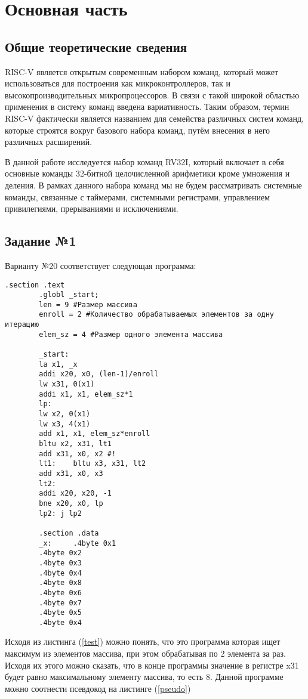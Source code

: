 \chapter{Основная часть}
\section{Общие теоретические сведения}

RISC-V является открытым современным набором команд, который может использоваться для
построения как микроконтроллеров, так и высокопроизводительных микропроцессоров.
В связи с такой широкой областью применения в систему команд введена вариативность.
Таким образом, термин RISC-V фактически является названием для семейства различных систем
команд, которые строятся вокруг базового набора команд, путём внесения в него различных расширений.


В данной работе исследуется набор команд RV32I, который включает в себя основные
команды 32-битной целочисленной арифметики кроме умножения и деления. В рамках
данного набора команд мы не будем рассматривать системные команды, связанные с
таймерами, системными регистрами, управлением привилегиями, прерываниями и исключениями.

\section{Задание №1}

Варианту №20 соответствует следующая программа:

\begin{lstlisting}[label=test,caption={Программа варианта №20}]
	  .section .text
		.globl _start;
		len = 9 #Размер массива
		enroll = 2 #Количество обрабатываемых элементов за одну итерацию
		elem_sz = 4 #Размер одного элемента массива
		
		_start:
		la x1, _x
		addi x20, x0, (len-1)/enroll
		lw x31, 0(x1)
		addi x1, x1, elem_sz*1
		lp:
		lw x2, 0(x1)
		lw x3, 4(x1)
		add x1, x1, elem_sz*enroll
		bltu x2, x31, lt1
		add x31, x0, x2 #!
		lt1:    bltu x3, x31, lt2
		add x31, x0, x3
		lt2:
		addi x20, x20, -1
		bne x20, x0, lp
		lp2: j lp2
		
		.section .data
		_x:     .4byte 0x1
		.4byte 0x2
		.4byte 0x3
		.4byte 0x4
		.4byte 0x8
		.4byte 0x6
		.4byte 0x7
		.4byte 0x5
		.4byte 0x4
\end{lstlisting}

Исходя из листинга (\ref{test}) можно понять, что это программа которая ищет максимум из элементов массива, при этом обрабатывая по 2 элемента за раз.
Исходя их этого можно сказать, что в конце программы значение в регистре x31 будет равно максимальному элементу массива, то есть 8. Данной программе можно соотнести псевдокод на листинге (\ref{pseudo})

